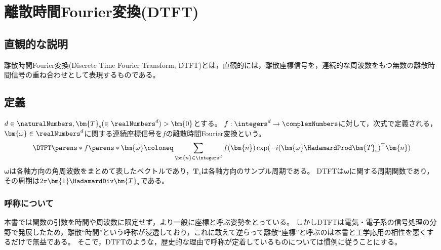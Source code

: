 \chapter{離散時間Fourier変換(DTFT)}
    \section{直観的な説明}
        離散時間Fourier変換(Discrete Time Fourier Transform, DTFT)とは，直観的には，離散座標信号を，連続的な周波数をもつ無数の離散時間信号の重ね合わせとして表現するものである。
    \section{定義}
        $d\in\naturalNumbers,\bm{T}_\mathrm{s}(\in\realNumbers^d)>\bm{0}$とする。
        $f:\integers^d\to\complexNumbers$に対して，次式で定義される，$\bm{\omega}\in\realNumbers^d$に関する連続座標信号を$f$の離散時間Fourier変換という。
        \[ \DTFT\parens*{f}\parens*{\bm{\omega}} \coloneq \sum_{\bm{n}\in\integers^d} f(\bm{n})\exp(-i(\bm{\omega}\HadamardProd\bm{T}_\mathrm{s})^\top\bm{n}) \]
        $\bm{\omega}$は各軸方向の角周波数をまとめて表したベクトルであり，$\bm{T}_\mathrm{s}$は各軸方向のサンプル周期である。
        DTFTは$\bm{\omega}$に関する周期関数であり，その周期は$2\pi\bm{1}\HadamardDiv\bm{T}_\mathrm{s}$である。
        \subsection{呼称について}
            本書では関数の引数を時間や周波数に限定せず，より一般に座標と呼ぶ姿勢をとっている。
            しかしDTFTは電気・電子系の信号処理の分野で発展したため，離散``時間''という呼称が浸透しており，これに敢えて逆らって離散``座標''と呼ぶのは本書と工学応用の相性を悪くするだけで無益である。
            そこで，DTFTのような，歴史的な理由で呼称が定着しているものについては慣例に従うことにする。
